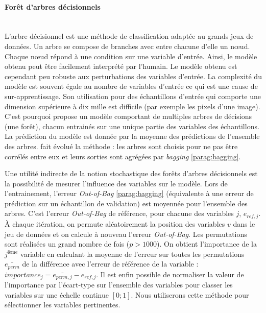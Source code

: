 \paragraph{Forêt d'arbres décisionnels}\mbox{\label{parag:random_forests}} \\
L'arbre décisionnel est une méthode de classification adaptée au grands jeux de données.
Un arbre se compose de branches avec entre chacune d'elle un nœud.
Chaque nœud répond à une condition sur une variable d'entrée.
Ainsi, le modèle obtenu peut être facilement interprété par l'humain.
Le modèle obtenu est cependant peu robuste aux perturbations des variables d'entrée.
La complexité du modèle est souvent égale au nombre de variables d'entrée ce qui est une cause de sur-apprentissage.
Son utilisation pour des échantillons d'entrée qui comporte une dimension supérieure à dix mille est difficile (par exemple les pixels d'une image).
C'est pourquoi \citeauthor{ho_random_1995}
\cite{ho_random_1995, ho_random_1998} propose un modèle comportant de multiples arbres de décisions (une forêt), chacun entrainés sur une unique partie des variables des échantillons.
La prédiction du modèle est donnée par la moyenne des prédictions de l'ensemble des arbres. 
\citeauthor{breiman_random_2001} \cite{breiman_random_2001} fait évolué la méthode : les arbres sont choisis pour ne pas être corrélés entre eux et leurs sorties sont agrégées par \textit{bagging} \ref{parag:bagging}.

Une utilité indirecte de la notion stochastique des forêts d'arbres décisionnels est la possibilité de mesurer l'influence des variables sur le modèle.
Lors de l'entrainement, l'erreur \textit{Out-of-Bag} \ref{parag:bagging} (équivalente à une erreur de prédiction sur un échantillon de validation) est moyennée pour l'ensemble des arbres.
C'est l'erreur \textit{Out-of-Bag} de référence, pour chacune des variables $j$, $e_{ref, j}$.
À chaque itération, on permute aléatoirement la position des variables $v$ dans le jeu de données et on calcule à nouveau l'erreur \textit{Out-of-Bag}.
Les permutations sont réalisées un grand nombre de fois ($p > 1000$).
On obtient l'importance de la $j^{\text{ième}}$ variable en calculant la moyenne de l'erreur sur toutes les permutations $\bar{e_{perm}}$ de la différence avec l'erreur de référence de la variable : $importance_{j} = \bar{e_{perm, j}} - e_{ref, j}$.
Il est enfin possible de normaliser la valeur de l'importance par l'écart-type sur l'ensemble des variables pour classer les variables sur une échelle continue $[0 ; 1]$.
Nous utiliserons cette méthode pour sélectionner les variables pertinentes.

